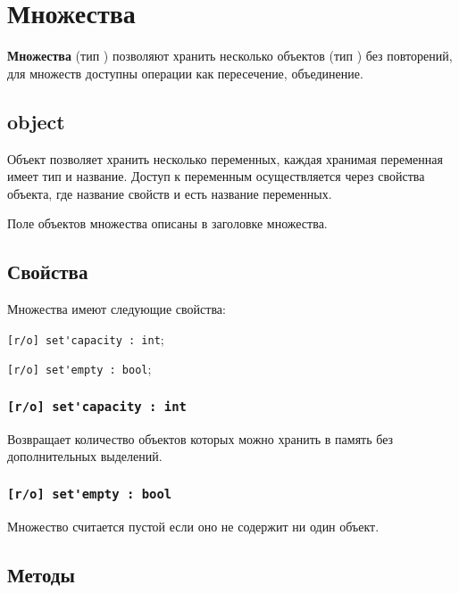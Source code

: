 \section{Множества}

{\bf Множества} (тип \set) позволяют хранить несколько объектов (тип \object) без повторений, для множеств доступны операции как пересечение, объединение.

\subsection{{\color{lightblue} object}}

Объект позволяет хранить несколько переменных, каждая хранимая переменная имеет тип и название. Доступ к переменным осуществляется через свойства объекта, где название свойств и есть название переменных.

Поле объектов множества описаны в заголовке множества.

\subsection{Свойства}

Множества имеют следующие свойства:
\begin{icItems}
\item \lstinline|[r/o] set'capacity : int|;
\item \lstinline|[r/o] set'empty : bool|;
\end{icItems}

\subsubsection{\lstinline|[r/o] set'capacity : int|}

Возвращает количество объектов которых можно хранить в память без дополнительных выделений.

\subsubsection{\lstinline|[r/o] set'empty : bool|}

Множество считается пустой если оно не содержит ни один объект.

\subsection{Методы}

